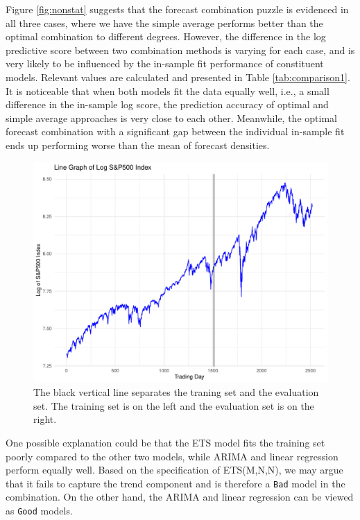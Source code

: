 \documentclass{monashthesis}
\begin{document}
Figure \ref{fig:nonstat} suggests that the forecast combination puzzle is evidenced in all three cases, where we have the simple average performs better than the optimal combination to different degrees. However, the difference in the log predictive score between two combination methods is varying for each case, and is very likely to be influenced by the in-sample fit performance of constituent models. Relevant values are calculated and presented in Table \ref{tab:comparison1}. It is noticeable that when both models fit the data equally well, i.e., a small difference in the in-sample log score, the prediction accuracy of optimal and simple average approaches is very close to each other. Meanwhile, the optimal forecast combination with a significant gap between the individual in-sample fit ends up performing worse than the mean of forecast densities.

\begin{figure}[ht]
\centering
\includegraphics[scale=0.4]{figures/log_linegraph.pdf}
\caption{The black vertical line separates the traning set and the evaluation set. The training set is on the left and the evaluation set is on the right.}
\label{fig:llg}
\end{figure}

One possible explanation could be that the ETS model fits the training set poorly compared to the other two models, while ARIMA and linear regression perform equally well. Based on the specification of ETS(M,N,N), we may argue that it fails to capture the trend component and is therefore a \texttt{Bad} model in the combination. On the other hand, the ARIMA and linear regression can be viewed as \texttt{Good} models.
\end{document}
